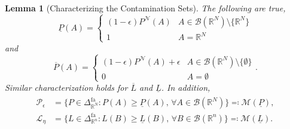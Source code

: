 \documentclass[12pt, english, oneside, a4paper]{article}
\newtheorem{lemma}[theorem]{Lemma}
\begin{document}
\begin{lemma}[Characterizing the Contamination Sets]\label{char_lemma}
    The following are true,
    $$\underline{P}(A)=
    \begin{cases}
    (1-\epsilon)P^\mathcal{N}(A) & A \in \mathcal{B}(\mathbb{R}^N) \setminus \{\mathbb{R}^N\}\\
    1 & A=\mathbb{R}^N
    \end{cases} 
    $$
    and
$$\overline{P}(A)=
    \begin{cases}
    (1-\epsilon)P^\mathcal{N}(A) + \epsilon & A \in \mathcal{B}(\mathbb{R}^N) \setminus \{\emptyset\}\\
    0 & A=\emptyset
    \end{cases}.
    $$
    Similar characterization holds for $\overline{L}$ and $\underline{L}$. In addition,
    {\small \begin{align}\label{cores}
    \begin{split}
    \mathcal{P}_\epsilon &= \{P \in \Delta_{\mathbb{R}^N}^\text{fa} : P(A) \geq \underline{P}(A) \text{, } \forall A \in \mathcal{B}(\mathbb{R}^N)\} \eqqcolon \mathcal{M}(\underline{P}),\\
    \mathcal{L}_\eta &= \{L \in \Delta_{\mathbb{R}^n}^\text{fa} : L(B) \geq \underline{L}(B) \text{, } \forall B \in \mathcal{B}(\mathbb{R}^n)\} \eqqcolon \mathcal{M}(\underline{L}).
 \end{split}
\end{align}}
\end{lemma}
\end{document}
